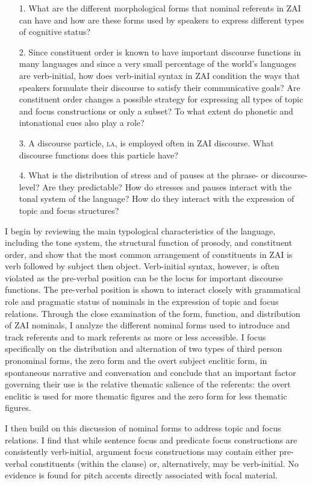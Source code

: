 \begin{itemize}
\item[1.] What are the different morphological forms that nominal referents in ZAI can have and how are these forms used by speakers to express different types of cognitive status?
\item[2.] Since constituent order is known to have important discourse functions in many languages and since a very small percentage of the world's languages are verb-initial, how does verb-initial syntax in ZAI condition the ways that speakers formulate their discourse to satisfy their communicative goals? Are constituent order changes a possible strategy for expressing all types of topic and focus constructions or only a subset? To what extent do phonetic and intonational cues also play a role?
\item[3.] A discourse particle, \textsc{la}, is employed often in ZAI discourse. What discourse functions does this particle have?
\item[4.] What is the distribution of stress and of pauses at the phrase- or discourse-level? Are they predictable? How do stresses and pauses interact with the tonal system of the language? How do they interact with the expression of topic and focus structures?
\end{itemize}

I begin by reviewing the main typological characteristics of the language, including the tone system, the structural function of prosody, and constituent order, and show that the most common arrangement of constituents in ZAI is verb followed by subject then object. Verb-initial syntax, however, is often violated as the pre-verbal position can be the locus for important discourse functions. The pre-verbal position is shown to interact closely with grammatical role and pragmatic status of nominals in the expression of topic and focus relations. Through the close examination of the form, function, and distribution of ZAI nominals, I analyze the different nominal forms used to introduce and track referents and to mark referents as more or less accessible. I focus specifically on the distribution and alternation of two types of third person pronominal forms, the zero form and the overt subject enclitic form, in spontaneous narrative and conversation and conclude that an important factor governing their use is the relative thematic salience of the referents: the overt enclitic is used for more thematic figures and the zero form for less thematic figures. 

I then build on this discussion of nominal forms to address topic and focus relations. I find that while sentence focus and predicate focus constructions are consistently verb-initial, argument focus constructions may contain either pre-verbal constituents (within the clause) or, alternatively, may be verb-initial. No evidence is found for pitch accents directly associated with focal material. 

